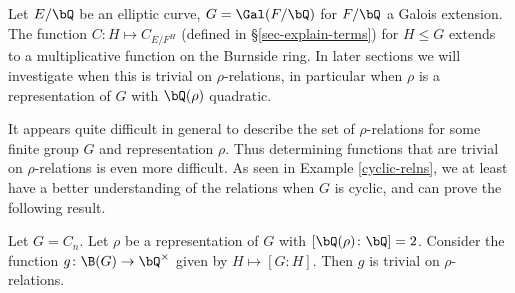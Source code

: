 \begin{example}
Let $E / \bQ$ be an elliptic curve, $G = \Gal(F / \bQ)$ for $F / \bQ$ a Galois extension. The function $C \colon H \mapsto C_{E / F^H}$ (defined in \S\ref{sec-explain-terms}) for $H \leq G$ extends to a multiplicative function on the Burnside ring. In later sections we will investigate when this is trivial on $\rho$-relations, in particular when $\rho$ is a representation of $G$ with $\bQ(\rho)$ quadratic. 
\end{example}

It appears quite difficult in general to describe the set of $\rho$-relations for some finite group $G$ and representation $\rho$. Thus determining functions that are trivial on $\rho$-relations is even more difficult. As seen in Example \ref{cyclic-relns}, we at least have a better understanding of the relations when $G$ is cyclic, and can prove the following result.

\begin{prop}\label{index-fn-trivial}
    Let $G = C_n$. Let $\rho$ be a representation of $G$ with $[\bQ(\rho) \colon \bQ] = 2$. Consider the function $g \colon \B(G) \to \bQ^{\times}$ given by $H \mapsto [G : H]$. Then $g$ is trivial on $\rho$-relations.
\end{prop}

